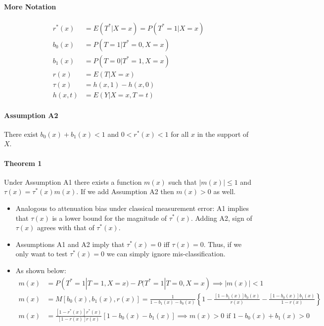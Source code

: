 \documentclass[12pt]{article}
\begin{document}
\paragraph{More Notation}
\begin{align*}
  r^*(x) &= E(T^*|X=x) = P(T^*=1|X=x)\\
  b_0(x) &= P(T=1|T^*=0,X=x)\\
  b_1(x) &= P(T=0|T^*=1,X=x)\\
  r(x) &= E(T|X=x)\\
  \tau(x) &= h(x,1) - h(x,0)\\
  h(x,t) &= E(Y|X=x,T=t)
\end{align*}

\paragraph{Assumption A2} There exist $b_0(x) + b_1(x) <1$ and $0 < r^*(x) <1$ for all $x$ in the support of $X$.
\paragraph{Theorem 1} Under Assumption A1 there exists a function $m(x)$ such that $|m(x)|\leq 1$ and $\tau(x) = \tau^*(x)m(x)$.
If we add Assumption A2 then $m(x)>0$ as well.

\begin{itemize}
  \item Analogous to attenuation bias under classical measurement error: A1 implies that $\tau(x)$ is a lower bound for the magnitude of $\tau^*(x)$.
    Adding A2, sign of $\tau(x)$ agrees with that of $\tau^*(x)$.
  \item Assumptions A1 and A2 imply that $\tau^*(x)=0$ iff $\tau(x)=0$. Thus, if we only want to test $\tau^*(x) = 0$ we can simply ignore mis-classification.
  \item As shown below:
    \begin{align*}
      m(x) &= P(T^*=1|T=1,X=x) - P(T^*=1|T=0,X=x) \implies |m(x)|< 1\\
      m(x) &= M[b_0(x),b_1(x),r(x)] = \frac{1}{1 - b_1(x) - b_0(x)}\left\{ 1 -  \frac{\left[ 1 - b_1(x) \right]b_0(x)}{r(x)} - \frac{\left[ 1 - b_0(x) \right]b_1(x)}{1 - r(x)} \right\} \\
      m(x) &= \frac{[1 - r^*(x)]r^*(x)}{\left[ 1 - r(x) \right]r(x)}
      \left[ 1 - b_0(x) - b_1(x) \right] \implies m(x) >0 \mbox{ if } 1 - b_0(x) + b_1(x) > 0 
    \end{align*}
\end{itemize}
\end{document}

